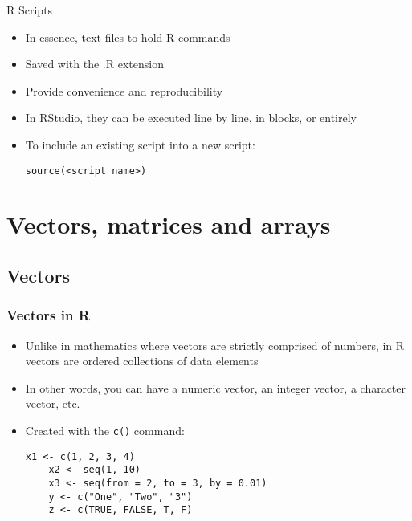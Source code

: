 \documentclass[10pt]{beamer}
\theoremstyle{definition}
\begin{document}
\begin{frame}[fragile]{R Scripts}
\begin{itemize}
	\item In essence, text files to hold R commands

	\item Saved with the .R extension
	
	\item Provide convenience and reproducibility
	
	\item In RStudio, they can be executed line by line, in blocks, or entirely

	\item To include an existing script into a new script:
	\begin{lstlisting}[style = rstyle, breaklines]
	source(<script name>)
	\end{lstlisting}
\end{itemize}
\end{frame}

\section{Vectors, matrices and arrays}
\subsection{Vectors}

\begin{frame}[fragile]
\frametitle{Vectors in R}
\begin{itemize}
	\item Unlike in mathematics where vectors are strictly comprised of numbers, in R vectors are ordered collections of data elements
	
	\item In other words, you can have a numeric vector, an integer vector, a character vector, etc.
	
	\item Created with the \texttt{c()} command:
	\begin{lstlisting}[style = rstyle, breaklines]
	x1 <- c(1, 2, 3, 4)
	x2 <- seq(1, 10)
	x3 <- seq(from = 2, to = 3, by = 0.01)
	y <- c("One", "Two", "3")
	z <- c(TRUE, FALSE, T, F)		
	\end{lstlisting}
\end{itemize}
\end{frame}
\end{document}
